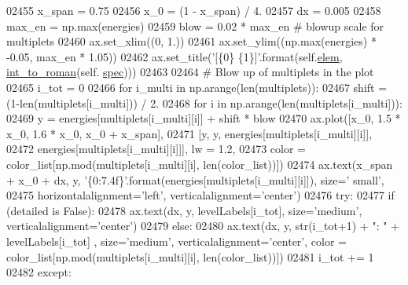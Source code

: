 \begin{DoxyCode}
{{{{{{{{{{{{{{{{{{{{{{02455         x\_span = 0.75
02456         x\_0 = (1 - x\_span) / 4.    
02457         dx = 0.005
02458         max\_en = np.max(energies)
02459         blow = 0.02 * max\_en \textcolor{comment}{# blowup scale for multiplets}
02460         ax.set\_xlim((0, 1.))
02461         ax.set\_ylim((np.max(energies) * -0.05, max\_en * 1.05))
02462         ax.set\_title(\textcolor{stringliteral}{'[\{0\} \{1\}]'}.format(self.\hyperlink{classpyneb_1_1core_1_1pynebcore_1_1_atom_ae722bd0e35e1c8cdc0018d56c34171cf}{elem}, \hyperlink{namespacepyneb_1_1utils_1_1misc_aec4e973d4cb9299f749ef190ea636a06}{int\_to\_roman}(self.
      \hyperlink{classpyneb_1_1core_1_1pynebcore_1_1_atom_a02c0f7146a2f5b8eac765a453c763797}{spec})))
02463 
02464         \textcolor{comment}{# Blow up of multiplets in the plot}
02465         i\_tot = 0
02466         \textcolor{keywordflow}{for} i\_multi \textcolor{keywordflow}{in} np.arange(len(multiplets)):
02467             shift = (1-len(multiplets[i\_multi])) / 2.
02468             \textcolor{keywordflow}{for} i \textcolor{keywordflow}{in} np.arange(len(multiplets[i\_multi])):
02469                 y = energies[multiplets[i\_multi][i]] + shift * blow
02470                 ax.plot([x\_0, 1.5 * x\_0, 1.6 * x\_0, x\_0 + x\_span], 
02471                          [y, y, energies[multiplets[i\_multi][i]], 
02472                           energies[multiplets[i\_multi][i]]], lw = 1.2, 
02473                          color = color\_list[np.mod(multiplets[i\_multi][i], len(color\_list))])
02474                 ax.text(x\_span + x\_0 + dx, y, \textcolor{stringliteral}{'\{0:7.4f\}'}.format(energies[multiplets[i\_multi][i]]), size=\textcolor{stringliteral}{'
      small'}, 
02475                          horizontalalignment=\textcolor{stringliteral}{'left'}, verticalalignment=\textcolor{stringliteral}{'center'})
02476                 \textcolor{keywordflow}{try}:
02477                     \textcolor{keywordflow}{if} (detailed \textcolor{keywordflow}{is} \textcolor{keyword}{False}):
02478                         ax.text(dx, y, levelLabels[i\_tot], size=\textcolor{stringliteral}{'medium'}, verticalalignment=\textcolor{stringliteral}{'center'})
02479                     \textcolor{keywordflow}{else}:
02480                         ax.text(dx, y, str(i\_tot+1) + \textcolor{stringliteral}{": "} + levelLabels[i\_tot] , size=\textcolor{stringliteral}{'medium'}, 
      verticalalignment=\textcolor{stringliteral}{'center'}, color = color\_list[np.mod(multiplets[i\_multi][i], len(color\_list))])
02481                     i\_tot += 1
02482                 \textcolor{keywordflow}{except}:
}}}}}}}}}}}}}}}}}}}}}}
\end{DoxyCode}
